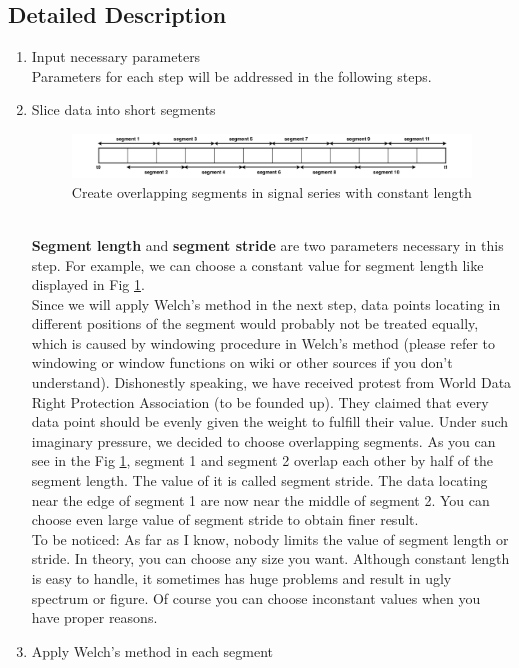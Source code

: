 \documentclass[
12pt, %
a4paper %
]{extreport}
\theoremstyle{plain}
\begin{document}
\subsection{Detailed Description}
\begin{enumerate}
\item Input necessary parameters\\
Parameters for each step will be addressed in the following steps. 
\item Slice data into short segments
\begin{figure}[ht]
	\centering
	\includegraphics[width=\textwidth]{segments.png}
	\caption{Create overlapping segments in signal series with constant length}
	\label{fig:segments}
\end{figure}\\
\textbf{Segment length} and \textbf{segment stride} are two parameters necessary in this step. For example, we can choose a constant value for segment length like displayed in Fig \ref{fig:segments}.\\
Since we will apply Welch’s method in the next step, data points locating in different positions of the segment would probably not be treated equally, which is caused by windowing procedure in Welch’s method (please refer to windowing or window functions on wiki or other sources if you don't understand). Dishonestly speaking, we have received protest from World Data Right Protection Association (to be founded up). They claimed that every data point should be evenly given the weight to fulfill their value. Under such imaginary pressure, we decided to choose overlapping segments. 
As you can see in the Fig \ref{fig:segments}, segment 1 and segment 2 overlap each other by half of the segment length. The value of it is called segment stride. The data locating near the edge of segment 1 are now near the middle of segment 2. You can choose even large value of segment stride to obtain finer result. \\
To be noticed: As far as I know, nobody limits the value of segment length or stride. In theory, you can choose any size you want. Although constant length is easy to handle, it sometimes has huge problems and result in ugly spectrum or figure. Of course you can choose inconstant values when you have proper reasons.
\item Apply Welch’s method in each segment 

\end{enumerate}
\end{document}
